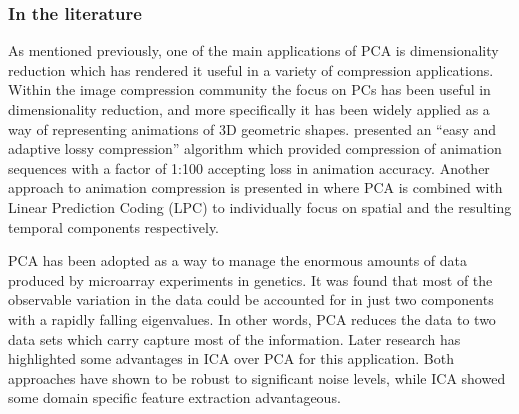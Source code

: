 %
%
%
%

\subsubsection{In the literature}
As mentioned previously, one of the main applications of PCA is dimensionality reduction which has rendered it useful in a variety of compression applications\citep{Vasilescu2003}\cite{Alexa2000}\cite{Zaeri2006}. Within the image compression community \citep{Vasilescu2003} the focus on PCs has been useful in dimensionality reduction, and more specifically it has been widely applied as a way of representing animations of 3D geometric shapes. \cite{Alexa2000} presented an ``easy and adaptive lossy compression'' algorithm which provided compression of animation sequences with a factor of 1:100 accepting loss in animation accuracy. Another approach to animation compression is presented in \cite{Karni2004} where PCA is combined with Linear Prediction Coding (LPC) to individually focus on spatial and the resulting temporal components respectively.

PCA has been adopted as a way to manage the enormous amounts of data produced by microarray experiments in genetics\cite{Raychaudhuri2000}\cite{Saidi2004}. It was found that most of the observable variation in the data could be accounted for in just two components with a rapidly falling eigenvalues\cite{Raychaudhuri2000}. In other words, PCA reduces the data to two data sets which carry capture most of the information\cite{Raychaudhuri2000}. Later research has highlighted some advantages in ICA over PCA for this application\cite{Saidi2004}. Both approaches have shown to be robust to significant noise levels, while ICA showed some domain specific feature extraction advantageous.

